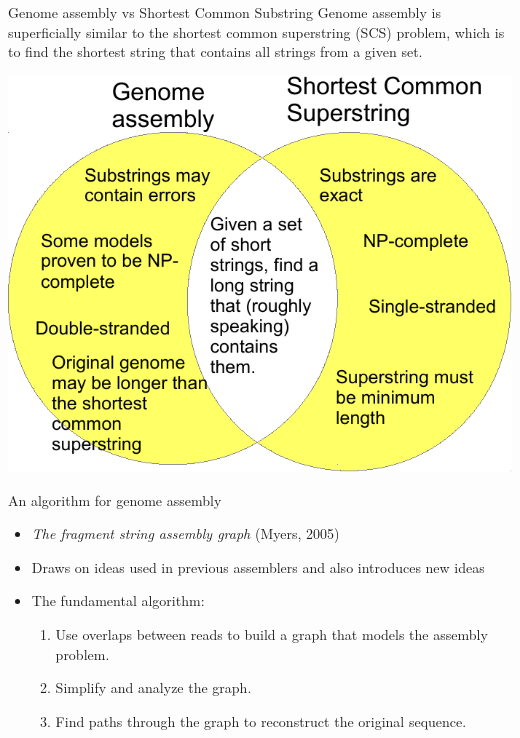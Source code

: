 \documentclass[xcolor=dvipsnames]{beamer}
\begin{document}
\begin{frame}{Genome assembly vs Shortest Common Substring}
	Genome assembly is superficially similar to the shortest common superstring
	(SCS) problem, which is to find the shortest string that contains all strings
	from a given set.
	\begin{center}
	\includegraphics[scale=0.6]{venn-crop.pdf}
	\end{center}
\end{frame}

\begin{frame}{An algorithm for genome assembly}

	\begin{itemize}
		\item {\it The fragment string assembly graph} (Myers, 2005)
		\item Draws on ideas used in previous assemblers and also introduces new
		ideas
		\item The fundamental algorithm:
		\begin{enumerate}
			\item Use overlaps between reads to build a graph that models the
			assembly problem.
			\item Simplify and analyze the graph.
			\item Find paths through the graph to reconstruct the original
			sequence.
		\end{enumerate}
	\end{itemize}
\end{frame}
\end{document}
